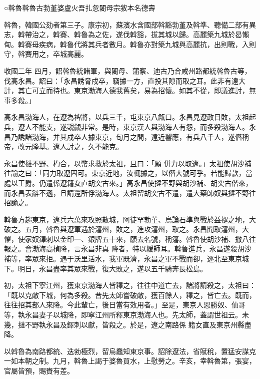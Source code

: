 
\begin{pinyinscope}

 ○斡魯斡魯古勃堇婆盧火吾扎忽闍母宗敘本名德壽



 斡魯，韓國公劾者第三子。康宗初，蘇濱水含國部斡豁勃堇及斡準、聽備二部有異志，斡帶治之，斡賽、斡魯為之佐，遂伐斡豁，拔其城以歸。高麗築九城於曷懶甸。斡賽母疾病，斡魯代將其兵者數月。斡魯亦對築九城與高麗抗，出則戰，入則守，斡賽用之，卒城高麗。



 收國二年
 四月，詔斡魯統諸軍，與闍母、蒲察、迪古乃合咸州路都統斡魯古等，伐高永昌。詔曰：「永昌誘脅戍卒，竊據一方，直投其隙而取之耳。此非有遠大計，其亡可立而待也。東京渤海人德我舊矣，易為招懷。如其不從，即議進討，無事多殺。」



 高永昌渤海人，在遼為裨將，以兵三千，屯東京八甔口。永昌見遼政日敗，太祖起兵，遼人不能支，遂覬覦非常。是時，東京漢人與渤海人有怨，而多殺渤海人。永昌乃誘諸渤海，并其戍卒人據東京，旬月之間，遠近響應，有兵八千人，遂僭稱帝，改元隆基。遼人討之，久不能克。



 永昌使撻不野、杓合，以幣求救於太祖，且曰：「願
 併力以取遼。」太祖使胡沙補往諭之曰：「同力取遼固可。東京近地，汝輒據之，以僭大號可乎。若能歸款，當處以王爵。仍遣係遼籍女直胡突古來。」高永昌使撻不野與胡沙補、胡突古偕來，而永昌表辭不遜，且請還所俘渤海人。太祖留胡突古不遣，遣大藥師奴與撻不野往招諭之。



 斡魯方趨東京，遼兵六萬來攻照散城，阿徒罕勃堇、烏論石準與戰於益褪之地，大破之。五月，斡魯與遼軍遇於瀋州，敗之，進攻瀋州，取之。永昌聞取瀋州，大懼，使家奴鐸刺以金印一、銀牌五十來，願去名號，稱籓。斡魯使胡沙補、撒八往報之。會渤海高楨降，言永昌非真
 降者，特以緩師耳。斡魯進兵，永昌遂殺胡沙補等，率眾來拒。遇于沃里活水，我軍既濟，永昌之軍不戰而卻，逐北至東京城下。明日，永昌盡率其眾來戰，復大敗之，遂以五千騎奔長松島。



 初，太祖下寧江州，獲東京渤海人皆釋之，往往中道亡去，諸將請殺之，太祖曰：「既以克敵下城，何為多殺。昔先太師嘗破敵，獲百餘人，釋之，皆亡去。既而，往往招其部人來降。今此輩亡，後日當有效用者。」至是，東京人恩勝奴、仙哥等，執永昌妻子以城降，即寧江州所釋東京渤海人也。先太師，蓋謂世祖云。未幾，撻不野執永昌及鐸刺以獻，皆殺之。於是，遼之南路係
 籍女直及東京州縣盡降。



 以斡魯為南路都統、迭勃極烈，留烏蠢知東京事。詔除遼法，省賦稅，置猛安謀克一如本朝之制。九月，斡魯上謁于婆魯買水，上慰勞之。辛亥，幸斡魯第，張宴，官屬皆預，賜賚有差。




\end{pinyinscope}
